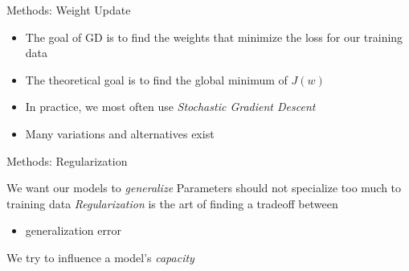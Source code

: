\begin{slide}{Methods: Weight Update}
  \centering
  \begin{itemize}
    \item<1-> The goal of GD is to find the weights that minimize the loss for our training data
    \item<2-> The theoretical goal is to find the global minimum of $J(w)$
    \item<3-> In practice, we most often use \emph{Stochastic Gradient Descent}
    \item<4-> Many variations and alternatives exist
  \end{itemize}
  \vspace{0.3cm}

\end{slide}

\begin{slide}{Methods: Regularization}
  \begin{itemize}
    \pitem We want our models to \emph{generalize}
    \pitem Parameters should not specialize too much to training data
    \pitem \emph{Regularization} is the art of finding a tradeoff between
    \begin{itemize}
      \pitem training error
      \item generalization error
    \end{itemize}
    \pitem We try to influence a model's \emph{capacity}
  \end{itemize}
\end{slide}

